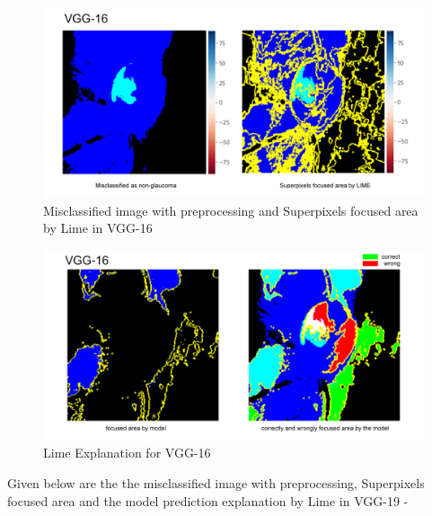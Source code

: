 \vspace{5mm}
\begin{figure}[hbt!]
\centering
\includegraphics[scale=0.5]{images/fig-46.png}
\caption{Misclassified image with preprocessing and Superpixels focused area by Lime in VGG-16}
\label{fig:x Misclassified image with preprocessing and Superpixels focused area by Lime in VGG-16}
\end{figure}

\vspace{5mm}
\begin{figure}[hbt!]
\centering
\includegraphics[scale=0.5]{images/fig-47.png}
\caption{Lime Explanation for VGG-16}
\label{fig:x Lime Explanation for VGG-16}
\end{figure}

\newpage
\vspace{5mm}
Given below are the the misclassified image with preprocessing, Superpixels focused area and the model prediction explanation by Lime in VGG-19 -

